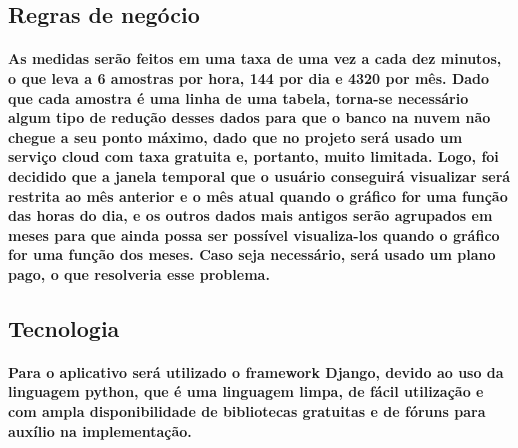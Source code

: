 \subsection{Regras de negócio}
\paragraph{As medidas serão feitos em uma taxa de uma vez a cada dez minutos, o que leva a 6 amostras por hora, 144 por dia e 4320 por mês. Dado que cada amostra é uma linha de uma tabela, torna-se necessário algum tipo de redução desses dados para que o banco na nuvem não chegue a seu ponto máximo, dado que no projeto será usado um serviço cloud com taxa gratuita e, portanto, muito limitada. Logo, foi decidido que a janela temporal que o usuário conseguirá visualizar será restrita ao mês anterior e o mês atual quando o gráfico for uma função das horas do dia, e os outros dados mais antigos serão agrupados em meses para que ainda possa ser possível visualiza-los quando o gráfico for uma função dos meses. Caso seja necessário, será usado um plano pago, o que resolveria esse problema.
}

\subsection{Tecnologia}
\paragraph{Para o aplicativo será utilizado o framework Django, devido ao uso da linguagem python, que é uma linguagem limpa, de fácil utilização e com ampla disponibilidade de bibliotecas gratuitas e de fóruns para auxílio na implementação.
}